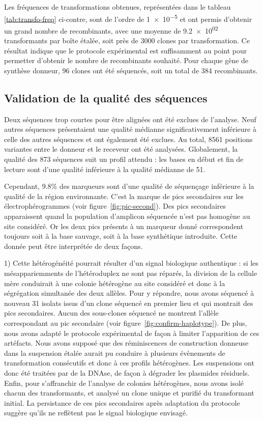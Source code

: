 Les fréquences de transformations obtenues, représentées dans le tableau
\ref{tab:transfo-freq} ci-contre, sont de l'ordre de \num{1e-5} et ont permis
d'obtenir un grand nombre de recombinants, avec une moyenne de \num{9.2e+02}
transformants par boîte étalée, soit près de \num{3000} clones par
transformation. Ce résultat indique que le protocole expérimental est
suffisamment au point pour permetter d'obtenir le nombre de recombinants
souhaité. Pour chaque gène de synthèse donneur, \num{96} clones ont été
séquencés, soit un total de \num{384} recombinants.

\subsection{Validation de la qualité des séquences}
\label{sub:result-qualite}

Deux séquences trop courtes pour être alignées ont été exclues de l'analyse.
Neuf autres séquences présentaient une qualité médianne significativement
inférieure à celle des autres séquences et ont également été exclues. Au total,
\num{8561} positions variantes entre le donneur et le receveur ont été
analysées. Globalement, la qualité des \num{873} séquences suit un profil
attendu : les bases en début et fin de lecture sont d'une qualité inférieure à
la qualité médianne de \num{51}.

Cependant, \num{9.8}\% des marqueurs sont d'une qualité de séquençage inférieure
à la qualité de la région environnante. C'est la marque de pics secondaires sur
les électrophérogrammes (voir figure~\ref{fig:pic-second}). Des pics secondaires
apparaissent quand la population d'amplicon séquencée n'est pas homogène au site
considéré. Or les deux pics présents à un marqueur donné correspondent toujours
soit à la base sauvage, soit à la base synthétique introduite. Cette donnée peut
être interprétée de deux façons.

1) Cette hétérogénéité pourrait résulter d'un signal biologique authentique : si
les mésappariemments de l'hétéroduplex ne sont pas réparés, la division de la
cellule mère conduirait à une colonie hétérogène au site considéré et donc à la
ségrégation simultanée des deux allèles. Pour y répondre, nous avons séquencé à
nouveau 31 isolats issus d'un clone séquencé en premier lieu et qui montrait des
pics secondaires. Aucun des sous-clones séquencé ne montrent l'allèle
correspondant au pic secondaire (voir figure~\ref{fig:confirm-haplotype}). De
plus, nous avons adapté le protocole expérimental de façon à limiter
l'apparition de ces artéfacts. Nous avons supposé que des réminiscences de
construction donneuse dans la suspension étalée aurait pu conduire à plusieurs
évènements de transformation consécutifs et donc à ces profils hétérogènes. Les
suspensions ont donc été traitées par de la DNAse, de façon à dégrader les
plasmides résiduels. Enfin, pour s'affranchir de l'analyse de colonies
hétérogènes, nous avons isolé chacun des transformants, et analysé un clone
unique et purifié du transformant initial. La persistance de ces pics
secondaires après adaptation du protocole suggère qu'ils ne reflètent pas le
signal biologique envisagé.

